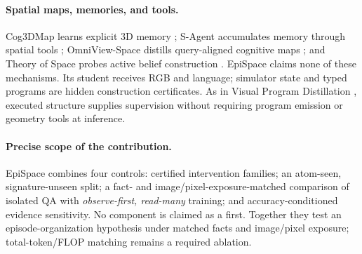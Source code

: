 \paragraph{Spatial maps, memories, and tools.}
Cog3DMap learns explicit 3D memory \citep{cog3dmap2026}; S-Agent accumulates
memory through spatial tools \citep{sagent2026}; OmniView-Space distills
query-aligned cognitive maps \citep{li2026omniview}; and Theory of Space probes
active belief construction \citep{theoryspace2026}.  EpiSpace claims none of
these mechanisms.  Its student receives RGB and language; simulator state and
typed programs are hidden construction certificates.  As in Visual Program
Distillation \citep{hu2023vpd}, executed structure supplies supervision without
requiring program emission or geometry tools at inference.

\paragraph{Precise scope of the contribution.}
EpiSpace combines four controls: certified intervention families;
an atom-seen, signature-unseen split; a fact- and image/pixel-exposure-matched
comparison of isolated QA with \emph{observe-first, read-many} training; and
accuracy-conditioned evidence sensitivity.  No component is claimed as a
first.  Together they test an episode-organization hypothesis under matched
facts and image/pixel exposure; total-token/FLOP matching remains a required
ablation.
